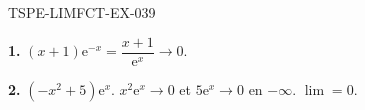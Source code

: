 \begin{corrige}{TSPE-LIMFCT-EX-039}

\textbf{1.} $(x+1)\mathrm{e}^{-x} = \dfrac{x+1}{\mathrm{e}^x} \to \boxed{0}$.

\textbf{2.} $(-x^2+5)\mathrm{e}^x$. $x^2\mathrm{e}^x \to 0$ et $5\mathrm{e}^x \to 0$ en $-\infty$. $\boxed{\lim = 0}$.

\end{corrige}

